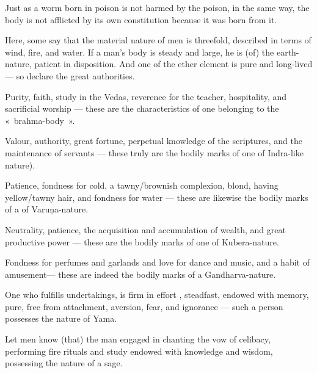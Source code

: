 \begin{translation}
\begin{tt}
\item[79]

Just as a worm  born in poison is not harmed by the poison, in the same way, the body is not afflicted by its own constitution because it was born from it.

\item[80]

Here, some say that the material nature of men is threefold, described in terms of wind, fire, and water. If a man’s body is steady and large, he is (of) the earth-nature, patient in disposition. And one of the ether element is pure and long-lived — so declare the great authorities.

\item[81]

Purity, faith, study in the Vedas, reverence for the teacher, hospitality, and sacrificial worship — these are the characteristics of one belonging to the « brahma-body ».

\item[82]

Valour, authority, great fortune, perpetual knowledge of the scriptures, and the maintenance of servants  — these truly  are the bodily marks of one of Indra-like nature).

\item[83]

Patience, fondness for cold, a tawny/brownish complexion, blond, having yellow/tawny hair, and fondness for water — these are likewise the bodily marks of a of Varuṇa-nature.

\item[84]

Neutrality, patience, the acquisition and accumulation of wealth, and great productive power  — these are the bodily marks of one of Kubera-nature.

\item[85]

Fondness for perfumes and garlands  and love for dance and music, and a habit of amusement— these are indeed the bodily marks  of a Gandharva-nature.

\item[86]

One who fulfills undertakings, is firm in effort , steadfast, endowed with memory, pure, free from attachment, aversion, fear, and ignorance — such a person possesses the nature of Yama.

\item[87]

Let men know (that) the man engaged in chanting the vow of celibacy, performing fire rituals and study  endowed with knowledge and wisdom, possessing the nature of a sage.


\end{tt}
\end{translation}

